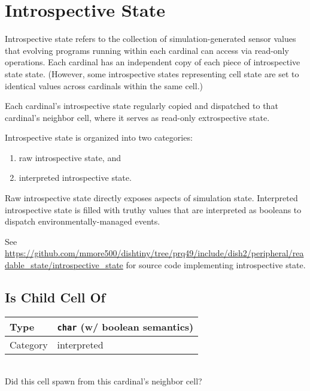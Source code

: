 \newcommand{\instrospectivestatedef}[2]{
    \begin{tabular}{|
        >{\columncolor[HTML]{C0C0C0}}l |l|}
        \hline
        Type & #1 \\ \hline
        Category & #2 \\ \hline
    \end{tabular} \\
}

\section{Introspective State}

Introspective state refers to the collection of simulation-generated sensor values that evolving programs running within each cardinal can access via read-only operations.
Each cardinal has an independent copy of each piece of introspective state state.
(However, some introspective states representing cell state are set to identical values across cardinals within the same cell.)

Each cardinal's introspective state regularly copied and dispatched to that cardinal's neighbor cell, where it serves as read-only extrospective state.

Introspective state is organized into two categories:
\begin{enumerate}
    \item raw introspective state, and
    \item interpreted introspective state.
\end{enumerate}

Raw introspective state directly exposes aspects of simulation state.
Interpreted introspective state is filled with truthy values that are interpreted as booleans to dispatch environmentally-managed events.

See \url{https://github.com/mmore500/dishtiny/tree/prq49/include/dish2/peripheral/readable_state/introspective_state} for source code implementing introspective state.

\subsection{Is Child Cell Of}

\instrospectivestatedef{\texttt{char} (w/ boolean semantics)}{interpreted}

Did this cell spawn from this cardinal's neighbor cell?

